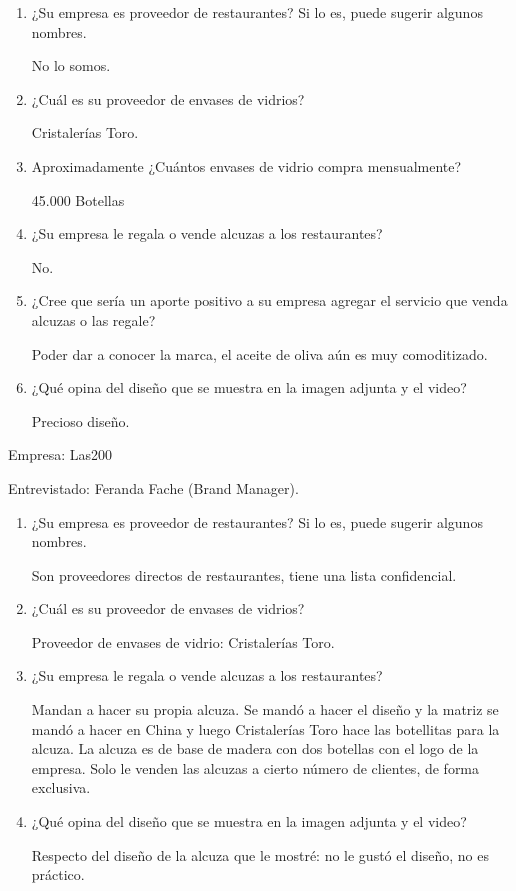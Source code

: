 \begin{enumerate}
\item ¿Su empresa es proveedor de restaurantes? Si lo es, puede sugerir algunos nombres.

No lo somos.

\item ¿Cuál es su proveedor de envases de vidrios?

Cristalerías Toro.

 \item Aproximadamente ¿Cuántos envases de vidrio compra mensualmente?

45.000 Botellas

 \item ¿Su empresa le regala o vende alcuzas a los restaurantes?

No.

\item ¿Cree que sería un aporte positivo a su empresa agregar el servicio que venda alcuzas o las regale?

 Poder dar a conocer la marca, el aceite de oliva aún es muy comoditizado.

\item ¿Qué opina del diseño que se muestra en la imagen adjunta y el video?

 Precioso diseño.

\end{enumerate}

Empresa: Las200

Entrevistado: Feranda Fache (Brand Manager).

\begin{enumerate}
\item ¿Su empresa es proveedor de restaurantes? Si lo es, puede sugerir algunos nombres.

Son proveedores directos de restaurantes, tiene una lista confidencial.

\item ¿Cuál es su proveedor de envases de vidrios?

Proveedor de envases de vidrio: Cristalerías Toro.

\item ¿Su empresa le regala o vende alcuzas a los restaurantes?

Mandan a hacer su propia alcuza. Se mandó a hacer el diseño y la matriz se mandó a hacer en China y luego Cristalerías Toro hace las botellitas para la alcuza. La alcuza es de base de madera con dos botellas con el logo de la empresa. Solo le venden las alcuzas a cierto número de clientes, de forma exclusiva.

\item ¿Qué opina del diseño que se muestra en la imagen adjunta y el video?

Respecto del diseño de la alcuza que le mostré: no le gustó el diseño, no es práctico.
\end{enumerate}

